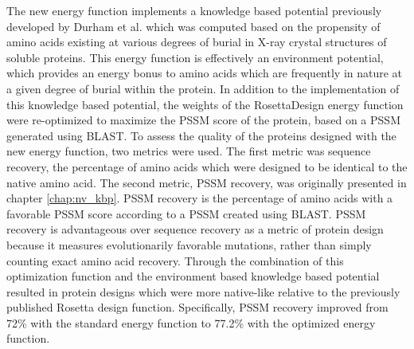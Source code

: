 The new energy function implements a knowledge based potential previously developed by Durham et al.\citep{Durham:2009kt} which was computed based on the propensity of amino acids existing at various degrees of burial in X-ray crystal structures of soluble proteins.
This energy function is effectively an environment potential, which provides an energy bonus to amino acids which are frequently in nature at a given degree of burial within the protein.
In addition to the implementation of this knowledge based potential, the weights of the RosettaDesign energy function were re-optimized to maximize the \ac{PSSM} score of the protein, based on a \ac{PSSM} generated using \ac{BLAST}.
To assess the quality of the proteins designed with the new energy function, two metrics were used.
The first metric was sequence recovery\citep{Kuhlman:2000tc}, the percentage of amino acids which were designed to be identical to the native amino acid.
The second metric, \ac{PSSM} recovery, was originally presented in chapter \ref{chap:nv_kbp}.
\ac{PSSM} recovery is the percentage of amino acids with a favorable \ac{PSSM} score according to a \ac{PSSM} created using \ac{BLAST}.
\ac{PSSM} recovery is advantageous over sequence recovery as a metric of protein design because it measures evolutionarily favorable mutations, rather than simply counting exact amino acid recovery.
Through the combination of this optimization function and the environment based knowledge based potential resulted in protein designs which were more native-like relative to the previously published Rosetta design function.
Specifically, \ac{PSSM} recovery improved from 72\% with the standard energy function to 77.2\% with the optimized energy function.

